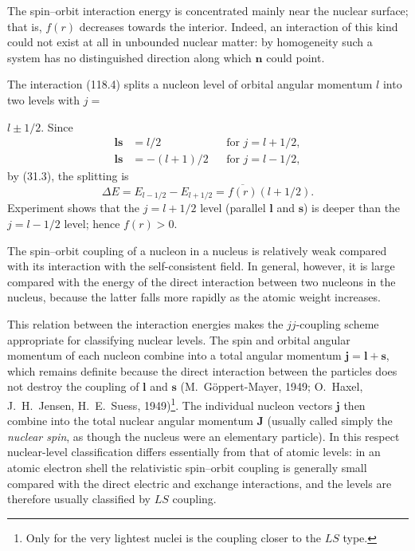 The spin--orbit interaction energy is concentrated mainly near the nuclear
surface; that is, $f(r)$ decreases towards the interior. Indeed, an
interaction of this kind could not exist at all in unbounded nuclear matter:
by homogeneity such a system has no distinguished direction along which
$\mathbf n$ could point.

The interaction (118.4) splits a nucleon level of orbital angular momentum
$l$ into two levels with $j=$

$l\pm1/2$. Since
\begin{equation}
 \begin{aligned}
  \mathbf l\mathbf s&=l/2 &&\text{for }j=l+1/2,\\
  \mathbf l\mathbf s&=-(l+1)/2 &&\text{for }j=l-1/2,
 \end{aligned}
 \tag{118.5}
\end{equation}
by (31.3), the splitting is
\begin{equation}
 \Delta E=E_{l-1/2}-E_{l+1/2}=\overline{f(r)}(l+1/2).
 \tag{118.6}
\end{equation}
Experiment shows that the $j=l+1/2$ level (parallel $\mathbf l$ and
$\mathbf s$) is deeper than the $j=l-1/2$ level; hence $f(r)>0$.

The spin--orbit coupling of a nucleon in a nucleus is relatively weak compared
with its interaction with the self-consistent field. In general, however, it
is large compared with the energy of the direct interaction between two
nucleons in the nucleus, because the latter falls more rapidly as the atomic
weight increases.

This relation between the interaction energies makes the $jj$-coupling scheme
appropriate for classifying nuclear levels. The spin and orbital angular
momentum of each nucleon combine into a total angular momentum
$\mathbf j=\mathbf l+\mathbf s$, which remains definite because the direct
interaction between the particles does not destroy the coupling of
$\mathbf l$ and $\mathbf s$ (M.~G\"oppert-Mayer, 1949; O.~Haxel,
J.~H.~Jensen, H.~E.~Suess, 1949)\footnote{Only for the very lightest nuclei is
the coupling closer to the $LS$ type.}. The individual nucleon vectors
$\mathbf j$ then combine into the total nuclear angular momentum $\mathbf J$
(usually called simply the \emph{nuclear spin}, as though the nucleus were an
elementary particle). In this respect nuclear-level classification differs
essentially from that of atomic levels: in an atomic electron shell the
relativistic spin--orbit coupling is generally small compared with the direct
electric and exchange interactions, and the levels are therefore usually
classified by $LS$ coupling.

